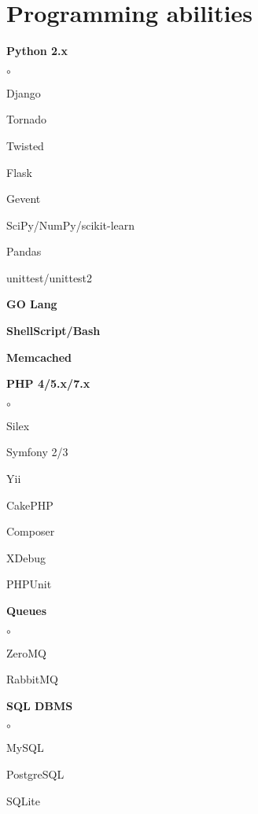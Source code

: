 \documentclass[9pt, a4paper, english]{extarticle}
\begin{document}
\section* {Programming abilities}
  \begin{multicols}{3}
    \begin {list}{\textbullet}{\itemsep=0mm}
      \item \textbf{Python 2.x}
        \begin {list}{$\circ$}{}
          \item Django
          \item Tornado
          \item Twisted
          \item Flask
          \item Gevent
          \item SciPy/NumPy/scikit-learn
          \item Pandas
          \item unittest/unittest2
        \end{list}
      \item \textbf{GO Lang}
      \item \textbf{ShellScript/Bash}
      \item \textbf{Memcached}
      \columnbreak
      \item \textbf{PHP 4/5.x/7.x}
        \begin {list}{$\circ$}{}
          \item Silex
          \item Symfony 2/3
          \item Yii
          \item CakePHP
          \item Composer
          \item XDebug
          \item PHPUnit
        \end{list}
      \item \textbf{Queues}
        \begin {list}{$\circ$}{}
          \item ZeroMQ
          \item RabbitMQ
        \end{list}
      \columnbreak
      \item \textbf{SQL DBMS}
        \begin {list}{$\circ$}{}
          \item MySQL
          \item PostgreSQL
          \item SQLite

\end{list}
\end{list}
\end{multicols}
\end{document}
